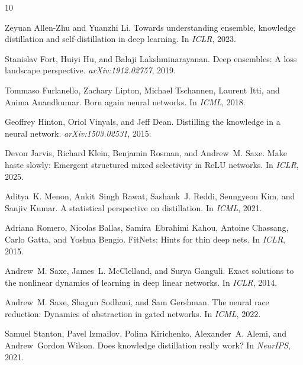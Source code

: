 \documentclass{article}
\begin{document}
\begin{thebibliography}{10}

Zeyuan Allen-Zhu and Yuanzhi Li.
\newblock Towards understanding ensemble, knowledge distillation and self-distillation in deep learning.
\newblock In \emph{ICLR}, 2023.

Stanislav Fort, Huiyi Hu, and Balaji Lakshminarayanan.
\newblock Deep ensembles: A loss landscape perspective.
\newblock \emph{arXiv:1912.02757}, 2019.

Tommaso Furlanello, Zachary Lipton, Michael Tschannen, Laurent Itti, and Anima Anandkumar.
\newblock Born again neural networks.
\newblock In \emph{ICML}, 2018.

Geoffrey Hinton, Oriol Vinyals, and Jeff Dean.
\newblock Distilling the knowledge in a neural network.
\newblock \emph{arXiv:1503.02531}, 2015.

Devon Jarvis, Richard Klein, Benjamin Rosman, and Andrew~M. Saxe.
\newblock Make haste slowly: Emergent structured mixed selectivity in ReLU networks.
\newblock In \emph{ICLR}, 2025.

Aditya~K. Menon, Ankit~Singh Rawat, Sashank~J. Reddi, Seungyeon Kim, and Sanjiv Kumar.
\newblock A statistical perspective on distillation.
\newblock In \emph{ICML}, 2021.

Adriana Romero, Nicolas Ballas, Samira~Ebrahimi Kahou, Antoine Chassang, Carlo Gatta, and Yoshua Bengio.
\newblock FitNets: Hints for thin deep nets.
\newblock In \emph{ICLR}, 2015.

Andrew~M. Saxe, James~L. McClelland, and Surya Ganguli.
\newblock Exact solutions to the nonlinear dynamics of learning in deep linear networks.
\newblock In \emph{ICLR}, 2014.

Andrew~M. Saxe, Shagun Sodhani, and Sam Gershman.
\newblock The neural race reduction: Dynamics of abstraction in gated networks.
\newblock In \emph{ICML}, 2022.

Samuel Stanton, Pavel Izmailov, Polina Kirichenko, Alexander~A. Alemi, and Andrew~Gordon Wilson.
\newblock Does knowledge distillation really work?
\newblock In \emph{NeurIPS}, 2021.

\end{thebibliography}

\appendix
\end{document}
